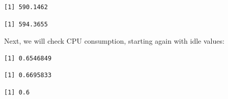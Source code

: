 \begin{verbatim}
[1] 590.1462
\end{verbatim}

\begin{Shaded}
\begin{Highlighting}[]
\SpecialCharTok{\$}
\end{Highlighting}
\end{Shaded}

\begin{verbatim}
[1] 594.3655
\end{verbatim}

Next, we will check CPU consumption, starting again with idle values:

\begin{Shaded}
\begin{Highlighting}[]
\SpecialCharTok{\$}
\end{Highlighting}
\end{Shaded}

\begin{verbatim}
[1] 0.6546849
\end{verbatim}

\begin{Shaded}
\begin{Highlighting}[]
\SpecialCharTok{\$}
\end{Highlighting}
\end{Shaded}

\begin{verbatim}
[1] 0.6695833
\end{verbatim}

\begin{Shaded}
\begin{Highlighting}[]
\SpecialCharTok{\$}
\end{Highlighting}
\end{Shaded}

\begin{verbatim}
[1] 0.6
\end{verbatim}

\begin{Shaded}
\begin{Highlighting}[]
\SpecialCharTok{\$}
\end{Highlighting}
\end{Shaded}

